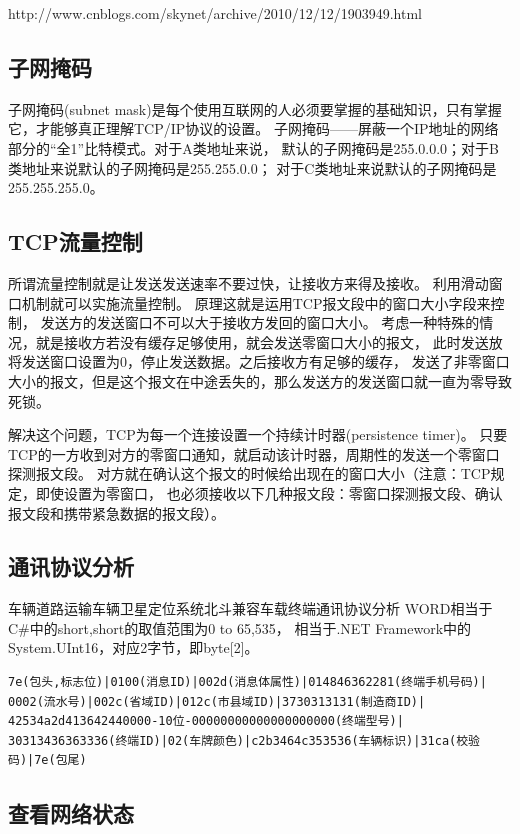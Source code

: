 \documentclass{book}
\begin{document}
http://www.cnblogs.com/skynet/archive/2010/12/12/1903949.html

\subsection{子网掩码}

子网掩码(subnet mask)是每个使用互联网的人必须要掌握的基础知识，只有掌握它，才能够真正理解TCP/IP协议的设置。
子网掩码——屏蔽一个IP地址的网络部分的“全1”比特模式。对于A类地址来说，
默认的子网掩码是255.0.0.0；对于B类地址来说默认的子网掩码是255.255.0.0；
对于C类地址来说默认的子网掩码是255.255.255.0。


\subsection{TCP流量控制}

所谓流量控制就是让发送发送速率不要过快，让接收方来得及接收。
利用滑动窗口机制就可以实施流量控制。
原理这就是运用TCP报文段中的窗口大小字段来控制，
发送方的发送窗口不可以大于接收方发回的窗口大小。
考虑一种特殊的情况，就是接收方若没有缓存足够使用，就会发送零窗口大小的报文，
此时发送放将发送窗口设置为0，停止发送数据。之后接收方有足够的缓存，
发送了非零窗口大小的报文，但是这个报文在中途丢失的，那么发送方的发送窗口就一直为零导致死锁。

解决这个问题，TCP为每一个连接设置一个持续计时器(persistence timer)。
只要TCP的一方收到对方的零窗口通知，就启动该计时器，周期性的发送一个零窗口探测报文段。
对方就在确认这个报文的时候给出现在的窗口大小（注意：TCP规定，即使设置为零窗口，
也必须接收以下几种报文段：零窗口探测报文段、确认报文段和携带紧急数据的报文段）。

\subsection{通讯协议分析}

车辆道路运输车辆卫星定位系统北斗兼容车载终端通讯协议分析
WORD相当于C\#中的short,short的取值范围为0 to 65,535，
相当于.NET Framework中的System.UInt16，对应2字节，即byte[2]。

\begin{lstlisting}
7e(包头,标志位)|0100(消息ID)|002d(消息体属性)|014846362281(终端手机号码)|
0002(流水号)|002c(省域ID)|012c(市县域ID)|3730313131(制造商ID)|
42534a2d413642440000-10位-00000000000000000000(终端型号)|
30313436363336(终端ID)|02(车牌颜色)|c2b3464c353536(车辆标识)|31ca(校验码)|7e(包尾)
\end{lstlisting}

\subsection{查看网络状态}
\end{document}
